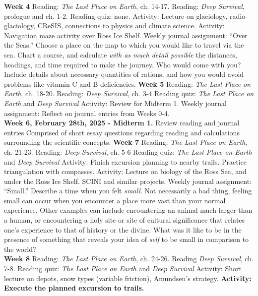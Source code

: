 \documentclass[10pt]{article}
\begin{document}
\begin{outline}[enumerate]
\clearpage
\1 \textbf{Week 4}
\2 Reading: \textit{The Last Place on Earth}, ch. 14-17.
\2 Reading: \textit{Deep Survival}, prologue and ch. 1-2.
\2 Reading quiz: none.
\2 Activity: Lecture on glaciology, radio-glaciology, CReSIS, connections to physics and climate science.
\2 Activity: Navigation maze activity over Ross Ice Shelf.
\2 Weekly journal assignment: ``Over the Seas.''  Choose a place on the map to which you would like to travel via the sea.  Chart a course, and calculate \textit{with as much detail possible} the distances, headings, and time required to make the journey.  Who would come with you?  Include details about necessary quantities of rations, and how you would avoid problems like vitamin C and B deficiencies.
\1 \textbf{Week 5}
\2 Reading: \textit{The Last Place on Earth}, ch. 18-20.
\2 Reading: \textit{Deep Survival}, ch. 3-4
\2 Reading quiz: \textit{The Last Place on Earth} and \textit{Deep Survival}
\2 Activity: Review for Midterm 1.
\2 Weekly journal assignment: Reflect on journal entries from Weeks 0-4. \\
\1 \textbf{Week 6, February 28th, 2025 - Midterm 1.}
\2 Review reading and journal entries
\2 Comprised of short essay questions regarding reading and calculations surrounding the scientific concepts.
\1 \textbf{Week 7}
\2 Reading: \textit{The Last Place on Earth}, ch. 21-23.
\2 Reading: \textit{Deep Survival}, ch. 5-6
\2 Reading quiz: \textit{The Last Place on Earth} and \textit{Deep Survival}
\2 Activity: Finish excursion planning to nearby trails.  Practice triangulation with compasses.
\2 Activity: Lecture on biology of the Ross Sea, and under the Ross Ice Shelf. SCINI and similar projects.
\2 Weekly journal assignment: ``Small.'' Describe a time when you felt \textit{small}.  Not necessarily a bad thing, feeling small can occur when you encounter a place more vast than your normal experience.  Other examples can include encountering an animal much larger than a human, or encountering a holy site or site of cultural significance that relates one's experience to that of history or the divine.  What was it like to be in the presence of something that reveals your idea of \textit{self} to be small in comparison to the world? \\
\1 \textbf{Week 8}
\2 Reading: \textit{The Last Place on Earth}, ch. 24-26.
\2 Reading \textit{Deep Survival}, ch. 7-8.
\2 Reading quiz: \textit{The Last Place on Earth} and \textit{Deep Survival}
\2 Activity: Short lecture on depots, snow types (variable friction), Amundsen's strategy.
\2 \textbf{Activity: Execute the planned excursion to trails.}

\end{outline}
\end{document}
